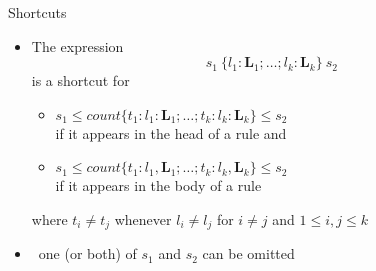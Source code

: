 \begin{frame}{Shortcuts}
  \begin{itemize}
  \item The expression
    \[
    s_1~\{ l_1:\boldsymbol{L}_1;\dots;l_k:\boldsymbol{L}_k\}~s_2
    \]
    is a shortcut for

    \begin{itemize}\normalsize
    \item
      \(
      s_1\leq\mathit{count}\{t_1:l_1:\boldsymbol{L}_1;\dots;t_k:l_k:\boldsymbol{L}_k\}\leq s_2
      \)
      \\\smallskip
      if it appears in the head of a rule and
      \\\medskip
    \item
      \(
      s_1\leq\mathit{count}\{t_1:l_1,\boldsymbol{L}_1;\dots;t_k:l_k,\boldsymbol{L}_k\}\leq s_2
      \)
      \\\smallskip
      if it appears in the body of a rule
    \end{itemize}
    where $t_i\neq t_j$ whenever $l_i\neq l_j$ for $i\neq j$ and $1\leq i,j\leq k$
    \medskip
  \item<2->  \ one (or both) of $s_1$ and $s_2$ can be omitted
  \end{itemize}
\end{frame}
